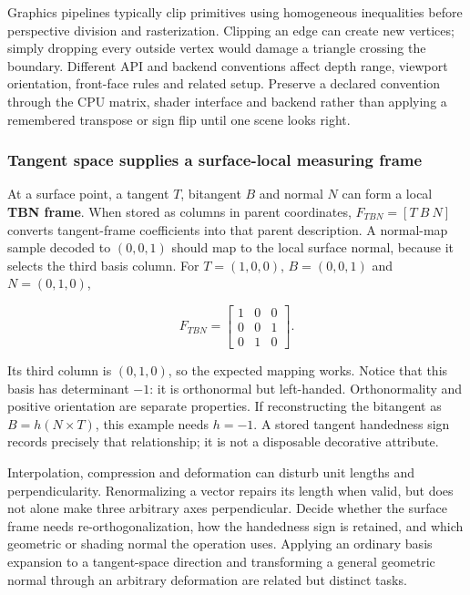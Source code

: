 Graphics pipelines typically clip primitives using homogeneous inequalities before perspective division and rasterization. Clipping an edge can create new vertices; simply dropping every outside vertex would damage a triangle crossing the boundary. Different API and backend conventions affect depth range, viewport orientation, front-face rules and related setup. Preserve a declared convention through the CPU matrix, shader interface and backend rather than applying a remembered transpose or sign flip until one scene looks right.

\subsubsection{Tangent space supplies a surface-local measuring frame}\label{tangent-space-supplies-a-surface-local-measuring-frame}

At a surface point, a tangent \(T\), bitangent \(B\) and normal \(N\) can form a local \textbf{TBN frame}. When stored as columns in parent coordinates, \(F_{TBN}=[T\ B\ N]\) converts tangent-frame coefficients into that parent description. A normal-map sample decoded to \((0,0,1)\) should map to the local surface normal, because it selects the third basis column. For \(T=(1,0,0)\), \(B=(0,0,1)\) and \(N=(0,1,0)\),

\[
F_{TBN}=\begin{bmatrix}1&0&0\\0&0&1\\0&1&0\end{bmatrix}.
\]

Its third column is \((0,1,0)\), so the expected mapping works. Notice that this basis has determinant \(-1\): it is orthonormal but left-handed. Orthonormality and positive orientation are separate properties. If reconstructing the bitangent as \(B=h(N\times T)\), this example needs \(h=-1\). A stored tangent handedness sign records precisely that relationship; it is not a disposable decorative attribute.

Interpolation, compression and deformation can disturb unit lengths and perpendicularity. Renormalizing a vector repairs its length when valid, but does not alone make three arbitrary axes perpendicular. Decide whether the surface frame needs re-orthogonalization, how the handedness sign is retained, and which geometric or shading normal the operation uses. Applying an ordinary basis expansion to a tangent-space direction and transforming a general geometric normal through an arbitrary deformation are related but distinct tasks.

